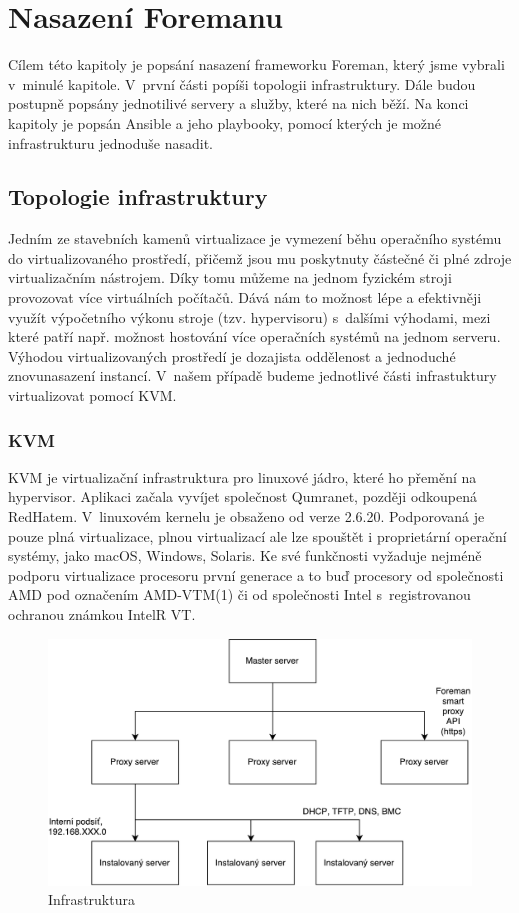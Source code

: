 \chapter{Nasazení Foremanu}

Cílem této kapitoly je popsání nasazení frameworku Foreman, který jsme vybrali v~minulé kapitole. V~první části popíši topologii infrastruktury. Dále budou postupně popsány jednotilivé servery a služby, které na nich běží. Na konci kapitoly je popsán Ansible a jeho playbooky, pomocí kterých je možné infrastrukturu jednoduše nasadit.

\section{Topologie infrastruktury}

Jedním ze stavebních kamenů virtualizace je vymezení běhu operačního systému do virtualizovaného prostředí, přičemž jsou mu poskytnuty částečné či plné zdroje virtualizačním nástrojem. Díky tomu můžeme na jednom fyzickém stroji provozovat více virtuálních počítačů. Dává nám to možnost lépe a efektivněji využít výpočetního výkonu stroje (tzv. hypervisoru) s~dalšími výhodami, mezi které patří např. možnost hostování více operačních systémů na jednom serveru.
Výhodou virtualizovaných prostředí je dozajista oddělenost a jednoduché znovunasazení instancí. V~našem případě budeme jednotlivé části infrastuktury virtualizovat pomocí KVM.


\subsection{KVM}


KVM je virtualizační infrastruktura pro linuxové jádro, které ho přemění na hypervisor. Aplikaci začala vyvíjet společnost Qumranet, později odkoupená RedHatem. V~linuxovém kernelu je obsaženo od verze 2.6.20. Podporovaná je pouze plná virtualizace, plnou virtualizací ale lze spouštět i proprietární operační systémy, jako macOS, Windows, Solaris. Ke své funkčnosti vyžaduje nejméně podporu virtualizace procesoru první generace a to buď procesory od společnosti AMD pod označením AMD-VTM(1) či od společnosti Intel s~registrovanou ochranou známkou IntelR VT.



\begin{figure}[h]\centering
\includegraphics[width=1\textwidth]{files/infrastruktura-v2.pdf}
	\caption{Infrastruktura}\label{fig:float}
\end{figure}
